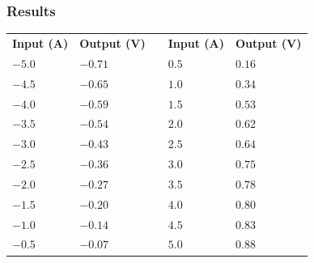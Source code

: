 \subsubsection{Results}

\begin{table}[H]
\begin{tabular}{|l|l|l| l|l|}
\cline{1-2}\cline{4-5}%
  \textbf{Input (A)}   & \textbf{Output (V)} &\phantom{hey}& \textbf{Input (A)}   & \textbf{Output (V)}\\
\cline{1-2}\cline{4-5}%
  $-5.0$               &            $-0.71$  &             & $0.5$                & $0.16$             \\
\cline{1-2}\cline{4-5}%
  $-4.5$               &            $-0.65$  &             & $1.0$                & $0.34$             \\
\cline{1-2}\cline{4-5}%
  $-4.0$               &            $-0.59$  &             & $1.5$                & $0.53$             \\
\cline{1-2}\cline{4-5}%
  $-3.5$               &            $-0.54$  &             & $2.0$                & $0.62$             \\
\cline{1-2}\cline{4-5}%
  $-3.0$               &            $-0.43$  &             & $2.5$                & $0.64$             \\
\cline{1-2}\cline{4-5}%
  $-2.5$               &            $-0.36$  &             & $3.0$                & $0.75$             \\
\cline{1-2}\cline{4-5}%
  $-2.0$               &            $-0.27$  &             & $3.5$                & $0.78$             \\
\cline{1-2}\cline{4-5}%
  $-1.5$               &            $-0.20$  &             & $4.0$                & $0.80$             \\
\cline{1-2}\cline{4-5}%
  $-1.0$               &            $-0.14$  &             & $4.5$                & $0.83$             \\
\cline{1-2}\cline{4-5}%
  $-0.5$               &            $-0.07$  &             & $5.0$                & $0.88$             \\
\cline{1-2}\cline{4-5}%
\end{tabular}
\end{table}

